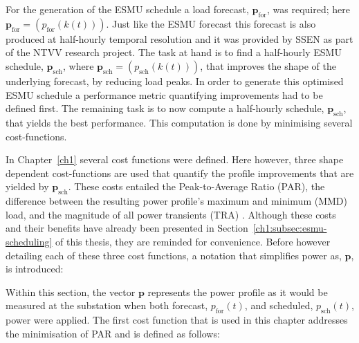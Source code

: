 For the generation of the ESMU schedule a load forecast, $\textbf{p}_\text{for}$, was required; here $\textbf{p}_\text{for} = (p_\text{for}(k(t)))$.
Just like the ESMU forecast this forecast is also produced at half-hourly temporal resolution and it was provided by SSEN as part of the NTVV research project.
The task at hand is to find a half-hourly ESMU schedule, $\textbf{p}_\text{sch}$, where $\textbf{p}_\text{sch} = (p_\text{sch}(k(t)))$, that improves the shape of the underlying forecast,  by reducing load peaks.
In order to generate this optimised ESMU schedule a performance metric quantifying improvements had to be defined first.
The remaining task is to now compute a half-hourly schedule, $\textbf{p}_\text{sch}$, that yields the best performance.
This computation is done by minimising several cost-functions.

In Chapter~\ref{ch1} several cost functions were defined.
Here however, three shape dependent cost-functions are used that quantify the profile improvements that are yielded by $\textbf{p}_\text{sch}$.
These costs entailed the Peak-to-Average Ratio (PAR), the difference between the resulting power profile's maximum and minimum (MMD) load, and the magnitude of all power transients (TRA) \cite{Mohsenian-Rad2010, Mostafa2016}.
Although these costs and their benefits have already been presented in Section~\ref{ch1:subsec:esmu-scheduling} of this thesis, they are reminded for convenience.
Before however detailing each of these three cost functions, a notation that simplifies power as, $\textbf{p}$, is introduced:



Within this section, the vector $\textbf{p}$ represents the power profile as it would be measured at the substation when both forecast, $p_\text{for}(t)$, and scheduled, $p_\text{sch}(t)$, power were applied.
The first cost function that is used in this chapter addresses the minimisation of PAR and is defined as follows:






